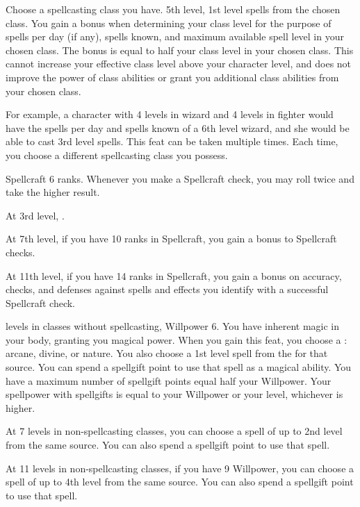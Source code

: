    Choose a spellcasting class you have.
    \featpres 5th level, 1st level spells from the chosen class.
    \featben You gain a bonus when determining your class level for the purpose of spells per day (if any), spells known, and maximum available spell level in your chosen class.
    The bonus is equal to half your class level in your chosen class.
    This cannot increase your effective class level above your character level, and does not improve the power of class abilities or grant you additional class abilities from your chosen class.

    For example, a character with 4 levels in wizard and 4 levels in fighter would have the spells per day and spells known of a 6th level wizard, and she would be able to cast 3rd level spells.
     This feat can be taken multiple times.
    Each time, you choose a different spellcasting class you possess.

    \featpre Spellcraft 6 ranks.
    \featben Whenever you make a Spellcraft check, you may roll twice and take the higher result.

    At 3rd level, \tdash.

    At 7th level, if you have 10 ranks in Spellcraft, you gain a  bonus to Spellcraft checks.

    At 11th level, if you have 14 ranks in Spellcraft, you gain a  bonus on accuracy, checks, and defenses against spells and  effects you identify with a successful Spellcraft check.

     levels in classes without spellcasting, Willpower 6.
    \featben You have inherent magic in your body, granting you magical power.
    When you gain this feat, you choose a : arcane, divine, or nature.
    You also choose a 1st level spell from the  for that source.
    You can spend a spellgift point to use that spell as a magical ability.
    You have a maximum number of spellgift points equal half your Willpower.
    Your spellpower with spellgifts is equal to your Willpower or your level, whichever is higher.

    At 7 levels in non-spellcasting classes, you can choose a spell of up to 2nd level from the same source. You can also spend a spellgift point to use that spell.

    At 11 levels in non-spellcasting classes, if you have 9 Willpower, you can choose a spell of up to 4th level from the same source. You can also spend a spellgift point to use that spell.

